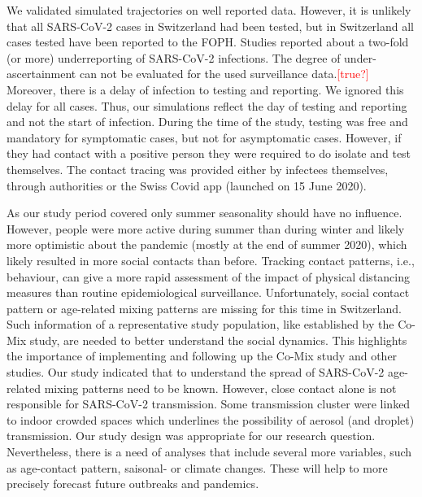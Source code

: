 \documentclass[10pt, a4paper, twoside]{article}
\begin{document}
\begin{multicols}{2}
We validated simulated trajectories on well reported data.
However, it is unlikely that all SARS-CoV-2 cases in Switzerland had been tested, but in Switzerland all cases tested have been reported to the FOPH.
Studies reported about a two-fold (or more) underreporting of SARS-CoV-2 infections.\cite{Li_substantial_2020,Wu_substantial_2020}
The degree of under-ascertainment can not be evaluated for the used surveillance data.\textcolor{red}{[true?]}
Moreover, there is a delay of infection to testing and reporting.
We ignored this delay for all cases.
Thus, our simulations reflect the day of testing and reporting and not the start of infection.
During the time of the study, testing was free and mandatory for symptomatic cases, but not for asymptomatic cases.
However, if they had contact with a positive person they were required to do isolate and test themselves. 
The contact tracing was provided either by infectees themselves, through authorities or the Swiss Covid app (launched on 15 June 2020).\cite{salath_early_2020}

As our study period covered only summer seasonality should have no influence.
However, people were more active during summer than during winter and likely more optimistic about the pandemic (mostly at the end of summer 2020), which likely resulted in more social contacts than before.
Tracking contact patterns, i.e., behaviour, can give a more rapid assessment of the impact of physical distancing measures than routine epidemiological surveillance.\cite{jarvis_quantifying_2020}
Unfortunately, social contact pattern or age-related mixing patterns are missing for this time in Switzerland.
Such information of a representative study population, like established by the Co-Mix study, are needed to better understand the social dynamics.\cite{coletti_comix_2020}
This highlights the importance of implementing and following up the Co-Mix study and other studies.
Our study indicated that to understand the spread of SARS-CoV-2 age-related mixing patterns need to be known.
However, close contact alone is not responsible for SARS-CoV-2 transmission.
Some transmission cluster were linked to indoor crowded spaces which underlines the possibility of aerosol (and droplet) transmission.\cite{tang_aerosol_2020}
Our study design was appropriate for our research question.
Nevertheless, there is a need of analyses that include several more variables, such as age-contact pattern, saisonal- or climate changes.
These will help to more precisely forecast future outbreaks and pandemics.


\end{multicols}
\end{document}
